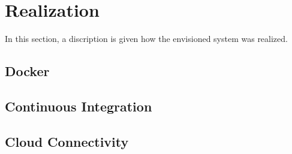 \section{Realization}
\label{sec:realization}

In this section, a discription is given how the envisioned system was realized.

\subsection{Docker}



\subsection{Continuous Integration}


\subsection{Cloud Connectivity}